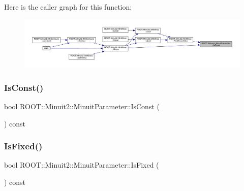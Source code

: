 Here is the caller graph for this function\+:
\nopagebreak
\begin{figure}[H]
\begin{center}
\leavevmode
\includegraphics[width=350pt]{dd/dfb/classROOT_1_1Minuit2_1_1MinuitParameter_afa82fc56a19c43531f469efc1fa34c2c_icgraph}
\end{center}
\end{figure}
\mbox{\label{classROOT_1_1Minuit2_1_1MinuitParameter_afa82fc56a19c43531f469efc1fa34c2c}} 
\subsubsection{\texorpdfstring{IsConst()}{IsConst()}\hspace{0.1cm}{\footnotesize\ttfamily [3/3]}}
{\footnotesize\ttfamily bool R\+O\+O\+T\+::\+Minuit2\+::\+Minuit\+Parameter\+::\+Is\+Const (\begin{DoxyParamCaption}{ }\end{DoxyParamCaption}) const\hspace{0.3cm}{\ttfamily [inline]}}

\mbox{\label{classROOT_1_1Minuit2_1_1MinuitParameter_a2d7f48ed0d6d1ac124e390e54df4de32}} 
\subsubsection{\texorpdfstring{IsFixed()}{IsFixed()}\hspace{0.1cm}{\footnotesize\ttfamily [1/3]}}
{\footnotesize\ttfamily bool R\+O\+O\+T\+::\+Minuit2\+::\+Minuit\+Parameter\+::\+Is\+Fixed (\begin{DoxyParamCaption}{ }\end{DoxyParamCaption}) const\hspace{0.3cm}{\ttfamily [inline]}}

